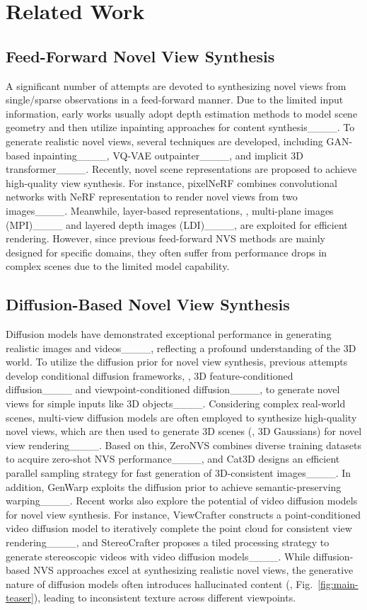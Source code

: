\section{Related Work}
\subsection{Feed-Forward Novel View Synthesis}
A significant number of attempts are devoted to synthesizing novel views from single/sparse observations in a feed-forward manner. Due to the limited input information, early works usually adopt depth estimation methods to model scene geometry and then utilize inpainting approaches for content synthesis____. To generate realistic novel views, several techniques are developed, including GAN-based inpainting____, VQ-VAE outpainter____, and implicit 3D transformer____. Recently, novel scene representations are proposed to achieve high-quality view synthesis. For instance, pixelNeRF combines convolutional networks with NeRF representation to render novel views from two images____. Meanwhile, layer-based representations, \eg, multi-plane images (MPI)____ and layered depth images (LDI)____, are exploited for efficient rendering.
However, since previous feed-forward NVS methods are mainly designed for specific domains, they often suffer from performance drops in complex scenes due to the limited model capability.

\subsection{Diffusion-Based Novel View Synthesis} 
Diffusion models have demonstrated exceptional performance in generating realistic images and videos____, reflecting a profound understanding of the 3D world.
To utilize the diffusion prior for novel view synthesis, previous attempts develop conditional diffusion frameworks, \eg, 3D feature-conditioned diffusion____ and viewpoint-conditioned diffusion____, to generate novel views for simple inputs like 3D objects____. Considering complex real-world scenes, multi-view diffusion models are often employed to synthesize high-quality novel views, which are then used to generate 3D scenes (\eg, 3D Gaussians) for novel view rendering____. Based on this, ZeroNVS combines diverse training datasets to acquire zero-shot NVS performance____, and Cat3D designs an efficient parallel sampling strategy for fast generation of 3D-consistent images____. In addition, GenWarp exploits the diffusion prior to achieve semantic-preserving warping____. Recent works also explore the potential of video diffusion models for novel view synthesis. For instance, ViewCrafter constructs a point-conditioned video diffusion model to iteratively complete the point cloud for consistent view rendering____, and StereoCrafter proposes a tiled processing strategy to generate stereoscopic videos with video diffusion models____. While diffusion-based NVS approaches excel at synthesizing realistic novel views, the generative nature of diffusion models often introduces hallucinated content (\eg, Fig.~\ref{fig:main-teaser}), leading to inconsistent texture across different viewpoints.


